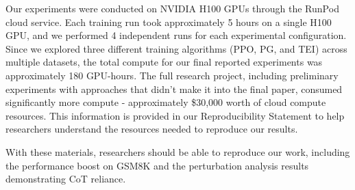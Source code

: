 \documentclass{article}
\begin{document}
Our experiments were conducted on NVIDIA H100 GPUs through the RunPod cloud service. Each training run took approximately 5 hours on a single H100 GPU, and we performed 4 independent runs for each experimental configuration. Since we explored three different training algorithms (PPO, PG, and TEI) across multiple datasets, the total compute for our final reported experiments was approximately 180 GPU-hours. The full research project, including preliminary experiments with approaches that didn't make it into the final paper, consumed significantly more compute - approximately \$30,000 worth of cloud compute resources. This information is provided in our Reproducibility Statement to help researchers understand the resources needed to reproduce our results.

With these materials, researchers should be able to reproduce our work, including the performance boost on GSM8K and the perturbation analysis results demonstrating CoT reliance.



\end{document}
